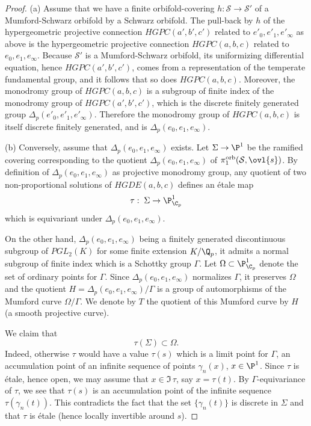 \begin{proof}
 (a) Assume that we have a finite orbifold-covering $h:
 \mathcal{S}\to \mathcal{S}'$ of a Mumford-Schwarz orbifold by a 
 Schwarz orbifold. The pull-back by $h$ of the hypergeometric projective
 connection $ HGPC(a',b',c') $ related to 
 $e'_0,e'_1,e'_\infty$ as above is the hypergeometric projective
 connection $HGPC(a,b,c) $ related to $e_0,e_1,e_\infty$. 
 Because $\mathcal{S}'$ is a Mumford-Schwarz orbifold, its uniformizing
 differential equation, hence $ HGPC(a',b',c') $, comes 
 from a representation of the temperate fundamental group, and it follows
 that so does $ HGPC(a,b,c) $. Moreover, the monodromy group of
 $HGPC(a,b,c) $ is a subgroup of finite index of the monodromy group of
 $HGPC(a',b',c') $, which is the discrete finitely generated group
 $\Delta_p(e'_0,e'_1,e'_\infty)$. Therefore the monodromy 
 group of $HGPC(a,b,c) $ is itself discrete finitely generated, and is
 $\Delta_p(e_0,e_1,e_\infty)$.  

 (b) Conversely, assume that $\Delta_p(e_0,e_1,e_\infty)$ exists. Let 
 $\Sigma \to \P^1$ be the ramified covering corresponding to the quotient 
 $\Delta_p(e_0,e_1,e_\infty)$ of
 $\pi_1^{\mathrm{orb}}(\mathcal{S},\ovl{s}) $. By 
 definition of $\Delta_p(e_0,e_1,e_\infty)$ as projective monodromy
 group, any quotient of two non-proportional solutions of 
 $HGDE(a,b,c)$ defines an \'etale map
 \begin{equation*}
 \tau: \;\Sigma \to \P^1_{\C_p}
 \end{equation*} which is equivariant under
 $\Delta_p(e_0,e_1,e_\infty)$.

 On the other hand, $\Delta_p(e_0,e_1,e_\infty)$ being
 a finitely generated discontinuous subgroup of $PGL_2(K)$ for some
 finite extension $K/\Q_p$, it admits a normal 
 subgroup of finite index which is a Schottky group $\Gamma$. Let
 $\Omega\subset \P^1_{\C_p}$ denote the set of ordinary 
 points for $\Gamma$. Since $\Delta_p(e_0,e_1,e_\infty)$ normalizes
 $\Gamma$, it preserves $\Omega$ and the quotient 
 $H=\Delta_p(e_0,e_1,e_\infty)/\Gamma$ is a group of automorphisms of the
 Mumford curve $\Omega/\Gamma$. We denote by $T$ 
 the quotient of this Mumford curve by $H$ (a smooth projective curve).

 We claim that
 \begin{equation*}
  \tau(\Sigma) \subset \Omega.
 \end{equation*}
 Indeed, otherwise $\tau$ would have a value $\tau(s)$ which is a limit
 point for $\Gamma$, \ie an accumulation point of an infinite sequence
 of points $\gamma_n(x)$, $x\in \P^1$. Since $\tau$ is \'etale, hence
 open, we may assume that $x\in \Im\,\tau$, say $x=\tau(t)$. By
 $\Gamma$-equivariance of $\tau$, we see that $\tau(s)$ is an
 accumulation point of the infinite sequence $\tau(\gamma_n(t))$. This
 contradicts the fact that the set $\{\gamma_n(t)\}$ is discrete in
 $\Sigma$ and that $\tau$ is \'etale (hence locally invertible around
 $s$).


\end{proof}

